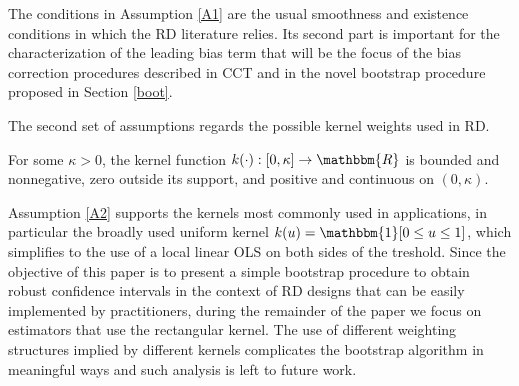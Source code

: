 \documentclass[12pt,fleqn]{article}
\begin{document}
The conditions in Assumption \ref{A1} are the usual smoothness and existence conditions in which the RD literature relies. Its second part is important for the characterization of the leading bias term that will be the focus of the bias correction procedures described in CCT and in the novel  bootstrap procedure proposed in Section \ref{boot}.

The second set of assumptions regards the possible kernel weights used in RD.

\begin{assumption}\label{A2}
 For some $\kappa>0$, the kernel function $k(\cdot):[0, \kappa] \rightarrow \mathbbm{R}$ is bounded and nonnegative, zero outside its support, and positive and continuous on $(0, \kappa)$.
\end{assumption}

Assumption \ref{A2} supports the kernels most commonly used in applications, in particular the broadly used uniform kernel $k(u)=\mathbbm{1}[0\leq u\leq 1]$, which simplifies to the use of a local linear OLS on both sides of the treshold. Since the objective of this paper is to present a simple bootstrap procedure to obtain robust confidence intervals in the context of RD designs that can be easily implemented by practitioners, during the remainder of the paper we focus on estimators that use the rectangular kernel. The use of different weighting structures implied by different kernels complicates the bootstrap algorithm in meaningful ways and such analysis is left to future work.
\end{document}
